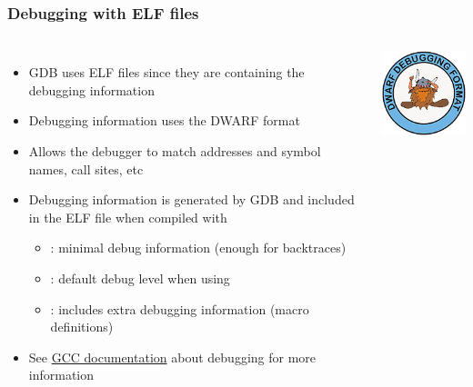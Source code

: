 \begin{frame}
\begin{columns}
    \end{columns}
  \end{frame}

\begin{frame}[fragile]
  \frametitle{Debugging with ELF files}
  \begin{columns}
    \begin{itemize}
      \item GDB uses ELF files since they are containing the debugging information
      \item Debugging information uses the DWARF format
      \item Allows the debugger to match addresses and symbol names, call
            sites, etc
      \item Debugging information is generated by GDB and included in the
            ELF file when compiled with 
      \begin{itemize}
        \item {}: minimal debug information (enough for backtraces)
        \item {}: default debug level when using 
        \item {}: includes extra debugging information (macro
          definitions)
      \end{itemize}
      \item See \href{https://gcc.gnu.org/onlinedocs/gcc/Debugging-Options.html}{GCC documentation}
        about debugging for more information
    \end{itemize}
    \includegraphics[height=0.3\textheight]{slides/debugging-linux-application-stack/dwarf_logo.jpg}
  \end{columns}
\end{frame}

